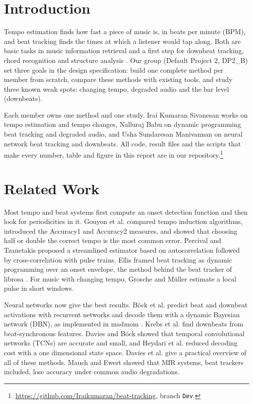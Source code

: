 \section{Introduction}

Tempo estimation finds how fast a piece of music is, in beats per minute (BPM), and beat tracking finds the times at which a listener would tap along. Both are basic tasks in music information retrieval and a first step for downbeat tracking, chord recognition and structure analysis \cite{tutorial}. Our group (Default Project 2, DP2\_B) set three goals in the design specification: build one complete method per member from scratch, compare these methods with existing tools, and study three known weak spots: changing tempo, degraded audio and the bar level (downbeats).

Each member owns one method and one study. Irai Kumaran Sivanesan works on tempo estimation and tempo changes, Nalluraj Babu on dynamic programming beat tracking and degraded audio, and Usha Sundaresan Manivannan on neural network beat tracking and downbeats. \MeIntro{} All code, result files and the scripts that make every number, table and figure in this report are in our repository.\footnote{\url{https://github.com/Iraikumaran/beat-tracking}, branch \texttt{Dev}.}

\section{Related Work}

Most tempo and beat systems first compute an onset detection function \cite{bello} and then look for periodicities in it. Gouyon et al. \cite{gouyon} compared tempo induction algorithms, introduced the Accuracy1 and Accuracy2 measures, and showed that choosing half or double the correct tempo is the most common error. Percival and Tzanetakis \cite{percival} proposed a streamlined estimator based on autocorrelation followed by cross-correlation with pulse trains. Ellis \cite{ellis} framed beat tracking as dynamic programming over an onset envelope, the method behind the beat tracker of librosa \cite{librosa}. For music with changing tempo, Grosche and M\"uller \cite{plp} estimate a local pulse in short windows.

Neural networks now give the best results. B\"ock et al. \cite{downbeat} predict beat and downbeat activations with recurrent networks and decode them with a dynamic Bayesian network (DBN), as implemented in madmom \cite{madmom}. Krebs et al. \cite{krebsbar} find downbeats from beat-synchronous features. Davies and B\"ock \cite{tcn} showed that temporal convolutional networks (TCNs) are accurate and small, and Heydari et al. \cite{heydari} reduced decoding cost with a one dimensional state space. Davies et al. \cite{tutorial} give a practical overview of all of these methods. Mauch and Ewert \cite{degradation} showed that MIR systems, beat trackers included, lose accuracy under common audio degradations.

